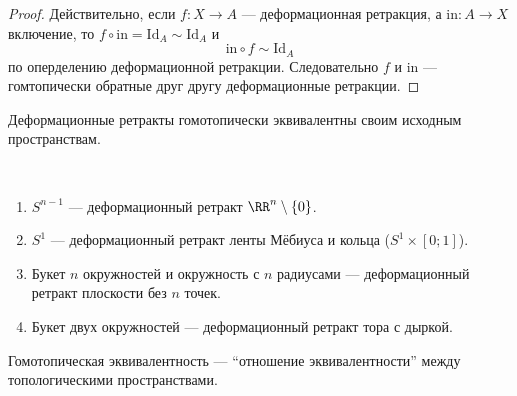 \documentclass[12pt,a4paper]{article}
\newcommand{\Id}{\ensuremath{\mathrm{Id}}\xspace}
\newcommand{\incl}{\mathrm{in}}
\begin{document}
    \begin{proof}
        Действительно, если $f: X \to A$ --- деформационная ретракция, а $\incl: A \to X$ включение, то $f \circ \incl = \Id_A \sim \Id_A$ и
        \[\incl \circ f \sim \Id_A\]
        по оперделению деформационной ретракции. Следовательно $f$ и $\incl$ --- гомтопически обратные друг другу деформационные ретракции.
    \end{proof}

    \begin{corollary}
        Деформационные ретракты гомотопически эквивалентны своим исходным пространствам.
    \end{corollary}

    \begin{example}\ 
        \begin{enumerate}
            \item $S^{n-1}$ --- деформационный ретракт $\RR^n \setminus \{0\}$.
            \item $S^1$ --- деформационный ретракт ленты Мёбиуса и кольца ($S^1 \times [0; 1]$).
            \item Букет $n$ окружностей и окружность с $n$ радиусами --- деформационный ретракт плоскости без $n$ точек.
            \item Букет двух окружностей --- деформационный ретракт тора с дыркой.
        \end{enumerate}
    \end{example}

    \begin{theorem}
        Гомотопическая эквивалентность --- ``отношение эквивалентности'' между топологическими пространствами.
    \end{theorem}
\end{document}
